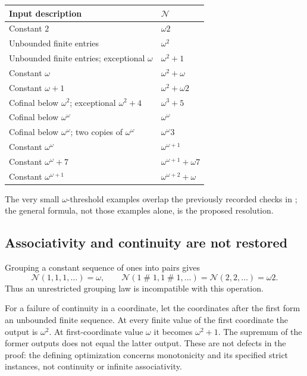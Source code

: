 \documentclass[11pt,letterpaper]{article}
\theoremstyle{definition}
\theoremstyle{remark}
\newcommand{\Nop}{\mathcal N}
\newcommand{\ns}{\mathbin{\#}}
\begin{document}
\begin{center}\small
\begin{tabular}{@{}p{}p{}@{}}
\toprule
Input description & $\Nop$ \\
\midrule
Constant $2$ & $\omega2$ \\
Unbounded finite entries & $\omega^2$ \\
Unbounded finite entries; exceptional $\omega$ & $\omega^2+1$ \\
Constant $\omega$ & $\omega^2+\omega$ \\
Constant $\omega+1$ & $\omega^2+\omega2$ \\
Cofinal below $\omega^2$; exceptional $\omega^2+4$ & $\omega^3+5$ \\
Cofinal below $\omega^\omega$ & $\omega^\omega$ \\
Cofinal below $\omega^\omega$; two copies of $\omega^\omega$ & $\omega^\omega3$ \\
Constant $\omega^\omega$ & $\omega^{\omega+1}$ \\
Constant $\omega^\omega+7$ & $\omega^{\omega+1}+\omega7$ \\
Constant $\omega^{\omega+1}$ & $\omega^{\omega+2}+\omega$ \\
\bottomrule
\end{tabular}
\end{center}

The very small $\omega$-threshold examples overlap the previously recorded checks in \cite[Remark 6.1]{Lip26}; the general formula, not those examples alone, is the proposed resolution.

\subsection{Associativity and continuity are not restored}

Grouping a constant sequence of ones into pairs gives
\[
 \Nop(1,1,1,\ldots)=\omega,
 \qquad
 \Nop(1\ns1,1\ns1,\ldots)=\Nop(2,2,\ldots)=\omega2.
\]
Thus an unrestricted grouping law is incompatible with this operation.

For a failure of continuity in a coordinate, let the coordinates after the first form an unbounded finite sequence. At every finite value of the first coordinate the output is $\omega^2$. At first-coordinate value $\omega$ it becomes $\omega^2+1$. The supremum of the former outputs does not equal the latter output. These are not defects in the proof: the defining optimization concerns monotonicity and its specified strict instances, not continuity or infinite associativity.
\end{document}
